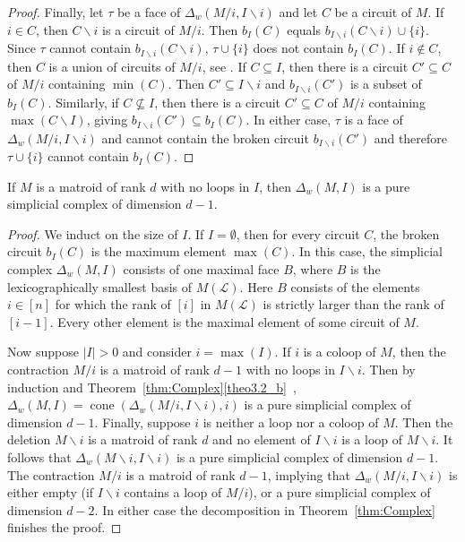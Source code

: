 \documentclass[ALCO,ThmDefs,Unicode,epreuves]{cedram}
\newcommand{\cL}{\mathcal{L}}
\DeclareMathOperator{\cone}{cone}
\begin{document}
\begin{proof}
Finally, let $\tau$ be a face of $\Delta_w(M/ i ,I\backslash i)$ and let $C$ be a circuit of $M$. 
If $i\in C$, then $C\backslash i $ is a circuit of $M/i$. Then 
$b_I(C)$ equals $b_{I\backslash i}(C\backslash i)\cup \{i\}$. Since $\tau$ cannot contain $b_{I\backslash i}(C\backslash i)$, $\tau \cup\{i\}$ does not contain $b_I(C)$. 
If $i\not\in C$, then $C$ is a union of circuits of $M/i$, see \cite[\S~3.1, Exercise~2]{Oxley}. 
If $C\subseteq I$, then there is a circuit $C' \subseteq C$ of $M/i$ containing $\min(C)$. 
Then $C'\subseteq I\backslash i$ and $b_{I\backslash i}(C')$ is a subset of $b_I(C)$. 
Similarly, if $C\not\subseteq I$, then there is a circuit $C' \subseteq C$ of $M/i$ containing $\max(C\backslash I)$, 
giving $b_{I\backslash i}(C') \subseteq b_I(C)$. In either case, $\tau$ is a face of $\Delta_w(M/ i ,I\backslash i)$ and cannot contain
the broken circuit $b_{I\backslash i}(C')$ and therefore $\tau \cup \{i\}$ cannot contain $b_I(C)$.%
\end{proof}



\begin{coro} \label{cor:DeltaDim}
If $M$ is a matroid of rank $d$ with no loops in $I$, then $\Delta_w(M,I)$ is a pure simplicial complex of dimension $d-1$.
\end{coro}

\begin{proof}
We induct on the size of $I$. If $I = \emptyset$, then for every circuit $C$, the broken circuit $b_I(C)$ is 
the maximum element $\max(C)$. In this case, the simplicial complex $\Delta_w(M,I)$ consists of 
one maximal face $B$, where $B$ is the lexicographically smallest basis of $M(\cL)$. 
Here $B$ consists of the elements $i\in [n]$ for which the rank of $[i]$ in $M(\cL)$ is strictly larger than the rank of $[i-1]$. 
Every other element is the maximal element of some circuit of $M$. 

Now suppose $|I| >0$ and consider $i = \max(I)$. If $i$ is a coloop of $M$, then the contraction $M/i$ is a matroid of rank $d-1$ with no loops in $I\backslash i$. 
Then by induction and Theorem~\ref{thm:Complex}\ref{theo3.2_b}~, $\Delta_w(M,I) = \cone (\Delta_w(M/i,I\backslash i),i)$ is a pure simplicial complex of 
dimension $d-1$. Finally, suppose $i$ is neither a loop nor a coloop of $M$. 
Then the deletion $M\backslash i$ is a matroid of rank $d$ and 
no element of $I\backslash i$ is a loop of $M\backslash i$. It follows that $\Delta_w(M\backslash i, I\backslash i)$ is a pure simplicial complex of 
dimension $d-1$. The contraction $M/i$ is a matroid of rank $d-1$, implying that $\Delta_w(M/i,I\backslash i)$ is either empty (if $I\backslash i$ contains a loop of $M/i$), 
or a pure simplicial complex of dimension $d-2$. In either case the decomposition in Theorem~\ref{thm:Complex} finishes the proof.
\end{proof}
\end{document}
